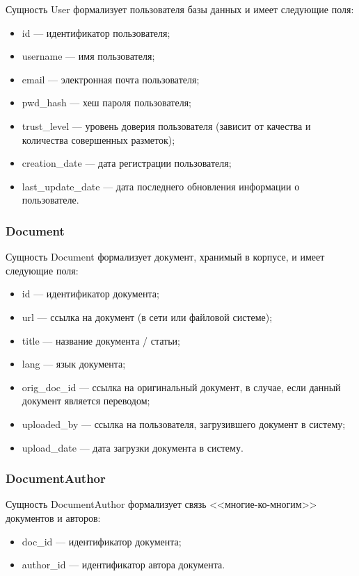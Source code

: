 Сущность User формализует пользователя базы данных и имеет следующие поля:
\begin{itemize}
    \item id --- идентификатор пользователя;
    \item username --- имя пользователя;
    \item email --- электронная почта пользователя;
    \item pwd\_hash --- хеш пароля пользователя;
    \item trust\_level --- уровень доверия пользователя (зависит от качества и количества совершенных разметок);
    \item creation\_date --- дата регистрации пользователя;
    \item last\_update\_date --- дата последнего обновления информации о пользователе.
\end{itemize}

\subsubsection*{Document}

Сущность Document формализует документ, хранимый в корпусе, и имеет следующие поля:
\begin{itemize}
    \item id --- идентификатор документа;
    \item url --- ссылка на документ (в сети или файловой системе);
    \item title --- название документа / статьи;
    \item lang --- язык документа;
    \item orig\_doc\_id --- ссылка на оригинальный документ, в случае, если данный документ является переводом;
    \item uploaded\_by --- ссылка на пользователя, загрузившего документ в систему;
    \item upload\_date --- дата загрузки документа в систему.
\end{itemize}

\subsubsection*{DocumentAuthor}

Сущность DocumentAuthor формализует связь <<многие-ко-многим>> документов и авторов:
\begin{itemize}
    \item doc\_id --- идентификатор документа;
    \item author\_id --- идентификатор автора документа.
\end{itemize}

